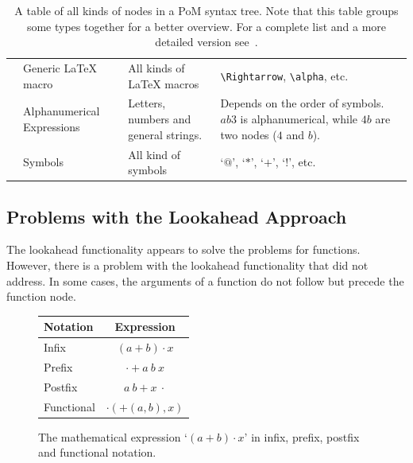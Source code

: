 \documentclass[a4paper,11pt]{article}
\newcommand{\tbs}{\textbackslash}
\theoremstyle{defTheoStyle}
\theoremstyle{defExampStyle}
\begin{document}
\begin{table}[t!]
\begin{tabularx}{\textwidth}{Y{1.55cm} Y{2.5cm} L L}
	 & Generic \LaTeX{} macro & All kinds of \LaTeX{} macros & \texttt{\tbs Rightarrow}, \texttt{\tbs alpha}, etc.\\
	 & Alphanumerical Expressions & Letters, numbers and general strings. & Depends on the order of symbols. $ab3$ is alphanumerical, while $4b$ are two nodes ($4$ and $b$).\\
	 & Symbols & All kind of symbols & `$@$', `$*$', `$+$', `$!$', etc.\\
	\hline
\end{tabularx}
\caption{A table of all kinds of nodes in a PoM syntax tree. Note that this table groups some types together for a better overview. For a complete list and a more detailed version see~\parencite{POM-Tagger}.}
\label{tab:allTypesTable}
\end{table} 

\subsection{Problems with the Lookahead Approach}
The lookahead functionality appears to solve the problems for functions. However, there is a problem with the lookahead functionality that  did not address. In some cases, the arguments of a function do not follow but precede the function node. 

\begin{figure} %
\vspace{4pt}
\begin{minipage}{0.38\textwidth}
\center
\begin{tabular}{lc}
\hline
Notation & Expression \\
\hline
Infix & $(a+b) \cdot x$\\
Prefix & $\cdot + a\ b\ x$\\
Postfix & $a\ b + x\ \cdot$\\
Functional & $\cdot(+(a, b), x)$\\
\hline
\end{tabular}
\caption{The mathematical expression `$(a+b) \cdot x$' in infix, prefix, postfix and functional notation.}
\label{tab:notations}
\end{minipage}
\end{figure}
\end{document}
